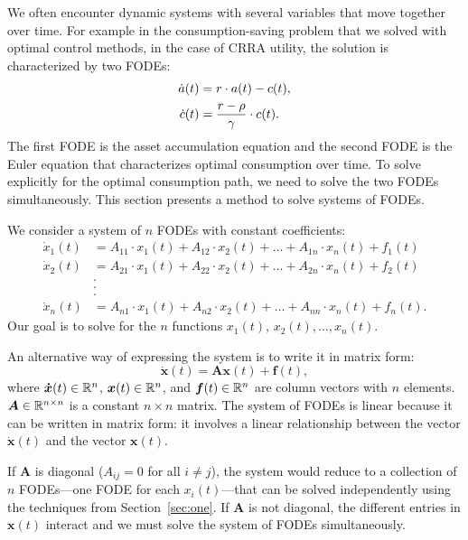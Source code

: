 \documentclass[letterpaper,12pt,leqno]{article}
\begin{document}
We often encounter dynamic systems with several variables that move together over time. For example in the consumption-saving problem that we solved with optimal control methods, in the case of CRRA utility, the solution is characterized by two FODEs:
\begin{align*}
\dot{a}(t) &=r\cdot a(t)-c(t), \\
\dot{c}(t) &=\frac{r-\rho}{\gamma}\cdot  c(t).
\end{align*}
The first FODE is the asset accumulation equation and the second FODE is the Euler equation that characterizes optimal consumption over time. To solve explicitly for the optimal consumption path, we need to solve the two FODEs
simultaneously. This section presents a method to solve systems of FODEs.


We consider a system of $n$ FODEs with constant coefficients:
\begin{align*}
\dot{x}_{1}(t) &=A_{11}\cdot x_{1}(t)+A_{12}\cdot x_{2}(t)+\ldots+A_{1n}\cdot x_{n}(t) +f_{1}(t) \\
\dot{x}_{2}(t) &=A_{21}\cdot x_{1}(t)+A_{22}\cdot x_{2}(t)+\ldots+A_{2n}\cdot x_{n}(t) +f_{2}(t) \\
&. \\
&. \\
&. \\
\dot{x}_{n}(t) &=A_{n1}\cdot x_{1}(t)+A_{n2}\cdot x_{2}(t)+\ldots+A_{nn}\cdot x_{n}(t) +f_{n}(t).
\end{align*}
Our goal is to solve for the $n$ functions $x_{1}(t)$, $x_{2}(t),\ldots, x_{n}(t)$.

An alternative way of expressing the system is to write it in matrix form:
\begin{equation}
\bm{\dot{x}}(t) =\bm{A}  \bm{x}(t) +\bm{f}(t), \label{eq:FODEsys}
\end{equation}
where $\bm{\dot{x}}(t) \in \mathbb{R}^{n}$, $\bm{x}(t) \in \mathbb{R}^{n}$, and $\bm{f}(t) \in \mathbb{R}^{n}$ are column vectors with $n$ elements. $\bm{A}\in \mathbb{R}^{n\times n}$ is a constant $n\times n$ matrix. The system of FODEs is linear because it can be written in matrix form: it involves a linear relationship between the vector $\bm{\dot{x}}(t)$ and the vector $\bm{x}(t)$.

If $\bm{A}$ is diagonal ($A_{ij}=0$ for all $i\neq j$), the system would reduce to a collection of $n$ FODEs---one FODE for each  $x_{i}(t)$---that can be solved independently using the techniques from Section~\ref{sec:one}.
If $\bm{A}$ is not diagonal, the different entries in $\bm{x}(t)$ interact and we must solve the system of FODEs simultaneously.
\end{document}

